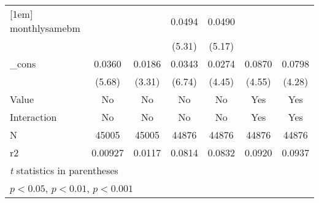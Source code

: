 {\begin{tabular}{l*{6}{c}}
[1em]
monthlysamebm&                     &                     &      0.0494\sym{***}&      0.0490\sym{***}&                     &                     \\
            &                     &                     &      (5.31)         &      (5.17)         &                     &                     \\
[1em]
\_cons      &      0.0360\sym{***}&      0.0186\sym{**} &      0.0343\sym{***}&      0.0274\sym{***}&      0.0870\sym{***}&      0.0798\sym{***}\\
            &      (5.68)         &      (3.31)         &      (6.74)         &      (4.45)         &      (4.55)         &      (4.28)         \\
\hline
Value       &          No         &          No         &          No         &          No         &         Yes         &         Yes         \\
Interaction &          No         &          No         &          No         &          No         &         Yes         &         Yes         \\
N           &       45005         &       45005         &       44876         &       44876         &       44876         &       44876         \\
r2          &     0.00927         &      0.0117         &      0.0814         &      0.0832         &      0.0920         &      0.0937         \\
\hline\hline
\multicolumn{7}{l}{\footnotesize \textit{t} statistics in parentheses}\\
\multicolumn{7}{l}{\footnotesize \sym{*} \(p<0.05\), \sym{**} \(p<0.01\), \sym{***} \(p<0.001\)}\\
\end{tabular}
}
